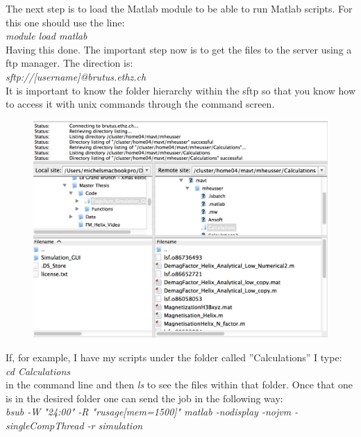 The next step is to load the Matlab module to be able to run Matlab scripts. For this one should use the line:\\

\textit{module load matlab}\\

Having this done. The important step now is to get the files to the server using a ftp manager. The direction is:\\

\textit{sftp://[username]@brutus.ethz.ch}\\

It is important to know the folder hierarchy within the sftp so that you know how to access it with unix commands through the command screen.

\begin{figure}[H]
	\centering
  \includegraphics[width=\textwidth]{Pictures/Screenshots/Sim36.png}
\end{figure} 

If, for example, I have my scripts under the folder called ''Calculations'' I type:\\

\textit{cd Calculations}\\

in the command line and then \textit{ls} to see the files within that folder. Once that one is in the desired folder one can send the job in the following way:\\

\textit{bsub -W "24:00" -R "rusage[mem=1500]" matlab -nodisplay -nojvm -singleCompThread -r simulation}\\

